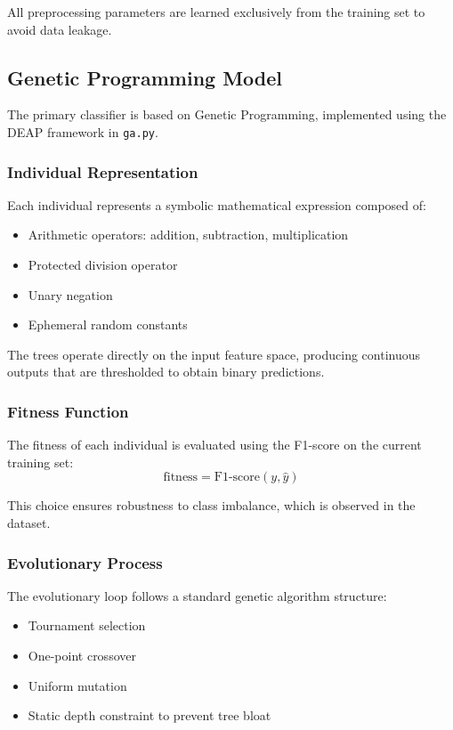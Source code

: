 \documentclass[12pt,a4paper]{article}
\begin{document}
All preprocessing parameters are learned exclusively from the training set to avoid data leakage.

\subsection{Genetic Programming Model}

The primary classifier is based on Genetic Programming, implemented using the DEAP framework in \texttt{ga.py}.

\subsubsection{Individual Representation}

Each individual represents a symbolic mathematical expression composed of:
\begin{itemize}
    \item Arithmetic operators: addition, subtraction, multiplication
    \item Protected division operator
    \item Unary negation
    \item Ephemeral random constants
\end{itemize}

The trees operate directly on the input feature space, producing continuous outputs that are thresholded to obtain binary predictions.

\subsubsection{Fitness Function}

The fitness of each individual is evaluated using the F1-score on the current training set:
\[
\text{fitness} = \text{F1-score}(y, \hat{y})
\]

This choice ensures robustness to class imbalance, which is observed in the dataset.

\subsubsection{Evolutionary Process}

The evolutionary loop follows a standard genetic algorithm structure:
\begin{itemize}
    \item Tournament selection
    \item One-point crossover
    \item Uniform mutation
    \item Static depth constraint to prevent tree bloat
\end{itemize}
\end{document}
